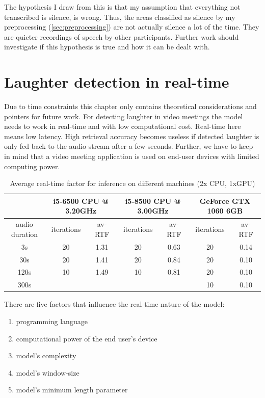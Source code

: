 \documentclass[bsc,frontabs,parskip,deptreport]{infthesis}
\begin{document}
The hypothesis I draw from this is that my assumption that everything not transcribed is silence, is wrong. Thus, the areas classified as silence by my preprocessing (\ref{sec:preprocessing}) are not actually silence a lot of the time. They are quieter recordings of speech by other participants. 
Further work should investigate if this hypothesis is true and how it can be dealt with. 



\chapter{Laughter detection in real-time} \label{cha:real-time}
Due to time constraints this chapter only contains theoretical considerations and pointers for future work. 
For detecting laughter in video meetings the model needs to work in real-time and with low computational cost. Real-time here means low latency.
High retrieval accuracy becomes useless if detected laughter is only fed back to the audio stream after a few seconds.
Further, we have to keep in mind that a video meeting application is used on end-user devices with limited computing power. 

\begin{table}[]
    \hspace{-2cm}
    \begin{tabular}{|c|c|c|c|c|c|c|}
    \hline
    & \multicolumn{2}{|c|}{i5-6500 CPU @ 3.20GHz} &
    \multicolumn{2}{|c|}{i5-8500 CPU @ 3.00GHz} & 
    \multicolumn{2}{|c|}{GeForce GTX 1060 6GB} \\ 
    \hline
    audio duration & iterations & av-RTF &
    iterations & av-RTF & iterations & av-RTF \\
    \hline
    3s & 20 & 1.31   & 20 & 0.63  & 20 & 0.14  \\
    30s & 20 & 1.41  & 20 & 0.84  & 20 & 0.10 \\
    120s & 10 & 1.49 &  10 & 0.81  & 20 & 0.10 \\
    300s &&&&                     & 10 & 0.10 \\
    \hline
    \end{tabular}
    \caption{Average real-time factor for inference on different machines (2x CPU, 1xGPU)}
    \label{tab:rtf}
\end{table}


There are five factors that influence the real-time nature of the model:
\begin{enumerate}
    \item programming language
    \item computational power of the end user's device
    \item model's complexity
    \item model's window-size
    \item model's minimum length parameter 
\end{enumerate}
\end{document}
